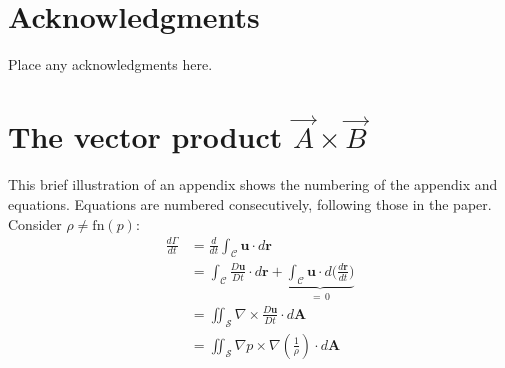 \documentclass[captionpatch,colorlinks,upint,subscriptcorrection,varvw,german]{asmeconf}
\begin{document}
\section*{Acknowledgments}
Place any acknowledgments here.



\nocite{*}%



\appendix


\section[The Vector Product A\times B]{The vector product $\vec{A}\times\vec{B}$}\label{appendix:a}

This brief illustration of an appendix shows the numbering of the appendix and equations. Equations are numbered
consecutively, following those in the paper. Consider $\rho \neq \textrm{fn}(p)$:
\begin{align}
\frac{d\Gamma}{dt} &{}= \frac{d}{dt} \int_{\mathcal{C}} \mathbf{u} \cdot d\mathbf{r}\\
				   &{}= \int_{\mathcal{C}} \frac{D\mathbf{u}}{Dt} \cdot d\mathbf{r} + \underbrace{\int_{\mathcal{C}} \mathbf{u}\cdot d\biggl( \frac{d\mathbf{r}}{dt}\biggr)}_{=\, 0} \\[-2pt]
                   &{}= \iint_{\mathcal{S}} \nabla \times \frac{D\mathbf{u}}{Dt}  \cdot d\mathbf{A}\\
                   &{}= \iint_{\mathcal{S}}  \nabla p \times \nabla \left( \frac{1}{\rho}\right) \cdot d\mathbf{A}
\end{align}
\end{document}
